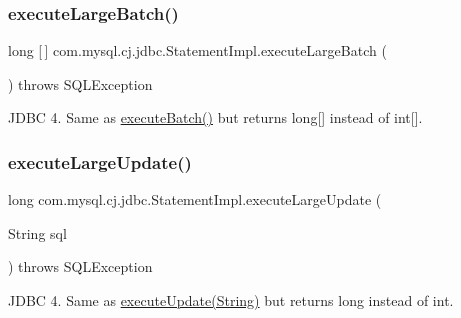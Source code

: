\subsubsection{\texorpdfstring{execute\+Large\+Batch()}{executeLargeBatch()}}
{\footnotesize\ttfamily long \mbox{[}$\,$\mbox{]} com.\+mysql.\+cj.\+jdbc.\+Statement\+Impl.\+execute\+Large\+Batch (\begin{DoxyParamCaption}{ }\end{DoxyParamCaption}) throws S\+Q\+L\+Exception}

J\+D\+BC 4. Same as \mbox{\hyperlink{classcom_1_1mysql_1_1cj_1_1jdbc_1_1_statement_impl_a812ff94727864cc68fe96aaa38dbce6a}{execute\+Batch()}} but returns long\mbox{[}\mbox{]} instead of int\mbox{[}\mbox{]}. \mbox{\label{classcom_1_1mysql_1_1cj_1_1jdbc_1_1_statement_impl_a33be0126be83d0094c9d363132497a4e}} 
\subsubsection{\texorpdfstring{execute\+Large\+Update()}{executeLargeUpdate()}\hspace{0.1cm}{\footnotesize\ttfamily [1/4]}}
{\footnotesize\ttfamily long com.\+mysql.\+cj.\+jdbc.\+Statement\+Impl.\+execute\+Large\+Update (\begin{DoxyParamCaption}\item[{String}]{sql }\end{DoxyParamCaption}) throws S\+Q\+L\+Exception}

J\+D\+BC 4. Same as \mbox{\hyperlink{classcom_1_1mysql_1_1cj_1_1jdbc_1_1_statement_impl_a8df7dbcd016833437419cfdbae14b187}{execute\+Update(\+String)}} but returns long instead of int. \mbox{\label{classcom_1_1mysql_1_1cj_1_1jdbc_1_1_statement_impl_acb364f005fd4a5b579ebecbc3303fca9}} 
